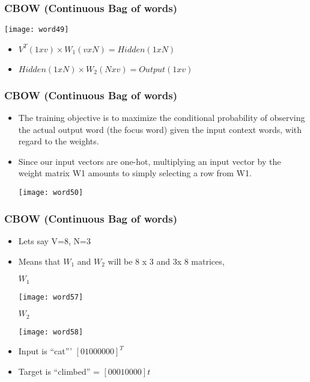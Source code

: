 \begin{frame}[fragile]\frametitle{CBOW (Continuous Bag of words)}

\begin{center}
\texttt{[image: word49]}
\end{center}
\begin{itemize}
\item $V^T(1xv) \times W_1(vxN) = Hidden(1xN)$
\item $Hidden(1xN)  \times W_2(Nxv) = Output(1xv)$
\end{itemize}
\end{frame}

\begin{frame}[fragile]\frametitle{CBOW (Continuous Bag of words)}
\begin{itemize}
\item The training objective is to maximize the conditional probability of observing the actual output word (the focus word) given the input context words, with regard to the weights. 
\item Since our input vectors are one-hot, multiplying an input vector by the weight matrix W1 amounts to simply selecting a row from W1.

\begin{center}
\texttt{[image: word50]}
\end{center}
\end{itemize}
\end{frame}

\begin{frame}[fragile]\frametitle{CBOW (Continuous Bag of words)}
\begin{itemize}
\item Lets say V=8, N=3 
\item Means that $W_1$ and $W_2$ will be 8 x 3 and 3x 8 matrices,

\begin{center}
$W_1$

\texttt{[image: word57]}

$W_2$

\texttt{[image: word58]}
\end{center}
\item Input is ``cat''' $[0 1 0 0 0 0 0 0]^T$
\item Target is ``climbed'' = $[0 0 0 1 0 0 0 0 ]t$
\end{itemize}
\end{frame}

